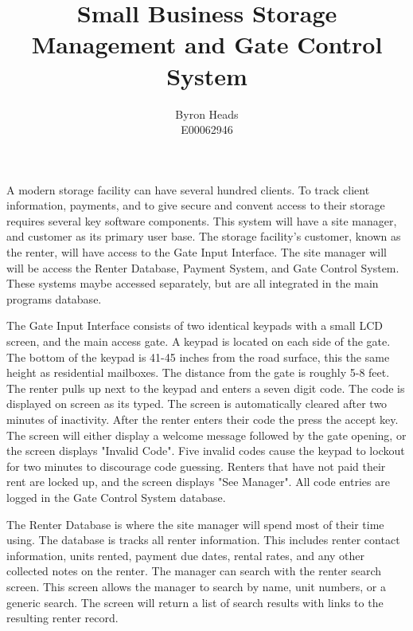 \documentclass[a4paper,10pt]{article}
\title{Small Business Storage Management and Gate Control System}
\author{Byron Heads \\
		E00062946}
\begin{document}
\maketitle

\paragraph*{}
A modern storage facility can have several hundred clients.  To track client information, payments,
and to give secure and convent access to their storage requires several key software components.
This system will have a site manager, and customer as its primary user base.  The storage facility's
customer, known as the renter, will have access to the Gate Input Interface.  The site manager will 
will be access the Renter Database, Payment System, and Gate Control System.  These systems maybe
accessed separately, but are all integrated in the main programs database.

The Gate Input Interface consists of two identical keypads with a small LCD screen, and the main 
access gate.  A keypad is located on each side of the gate.  The bottom of the keypad is 41-45 inches
from the road surface, this the same height as residential mailboxes.  The distance from the gate
is roughly 5-8 feet.  The renter pulls up next to the keypad and enters a seven digit code.  The code
is displayed on screen as its typed.  The screen is automatically cleared after two minutes of inactivity.
After the renter enters their code the press the accept key.  The screen will either display a welcome
message followed by the gate opening, or the screen displays "Invalid Code".  Five invalid codes cause
the keypad to lockout for two minutes to discourage code guessing.  Renters that have not paid their
rent are locked up, and the screen displays "See Manager". All code entries are logged in the Gate 
Control System database.

The Renter Database is where the site manager will spend most of their time using.  The database is tracks
all renter information.  This includes renter contact information, units rented, payment due dates, rental
rates, and any other collected notes on the renter.  The manager can search with the renter search screen.
This screen allows the manager to search by name, unit numbers, or a generic search.  The screen will
return a list of search results with links to the resulting renter record.
\end{document}
